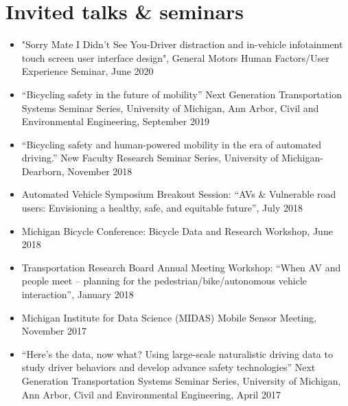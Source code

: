 \documentclass[11pt]{article}
\newenvironment{main}
{\begin{adjustwidth}{3em}{}}
{\end{adjustwidth}}
\begin{document}
\section*{Invited talks \& seminars}
\begin{main}

\begin{itemize}
    \item "Sorry Mate I Didn't See You-Driver distraction and in-vehicle infotainment touch screen user interface design", General Motors Human Factors/User Experience Seminar, June 2020

    \item “Bicycling safety in the future of mobility” Next Generation Transportation Systems Seminar Series, University of Michigan, Ann Arbor, Civil and Environmental Engineering, September 2019

    \item “Bicycling safety and human-powered mobility in the era of automated driving.” New Faculty Research Seminar Series, University of Michigan-Dearborn, November 2018

    \item Automated Vehicle Symposium Breakout Session: “AVs \& Vulnerable road users: Envisioning a healthy, safe, and equitable future”, July 2018

    \item Michigan Bicycle Conference: Bicycle Data and Research Workshop, June 2018

    \item Transportation Research Board Annual Meeting Workshop: “When AV and people meet – planning for the pedestrian/bike/autonomous vehicle interaction”, January 2018

    \item Michigan Institute for Data Science (MIDAS) Mobile Sensor Meeting, November 2017

    \item “Here's the data, now what? Using large-scale naturalistic driving data to study driver behaviors and develop advance safety technologies” Next Generation Transportation Systems Seminar Series, University of Michigan, Ann Arbor, Civil and Environmental Engineering, April 2017

\end{itemize}


\end{main}
\end{document}
